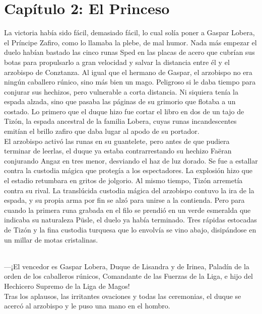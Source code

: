 \documentclass[
  letterpaper,
]{book}
\begin{document}

\hypertarget{capuxedtulo-2-el-princeso}{%
\chapter{Capítulo 2: El Princeso}\label{capuxedtulo-2-el-princeso}}

La victoria había sido fácil, demasiado fácil, lo cual solía poner a
Gaspar Lobera, el Príncipe Zafiro, como lo llamaba la plebe, de mal
humor. Nada más empezar el duelo habían bastado las cinco runas Sped en
las placas de acero que cubrían sus botas para propulsarlo a gran
velocidad y salvar la distancia entre él y el arzobispo de Conztanza. Al
igual que el hermano de Gaspar, el arzobispo no era ningún caballero
rúnico, sino más bien un mago. Peligroso si le daba tiempo para conjurar
sus hechizos, pero vulnerable a corta distancia. Ni siquiera tenía la
espada alzada, sino que pasaba las páginas de su grimorio que flotaba a
un costado. Lo primero que el duque hizo fue cortar el libro en dos de
un tajo de Tizón, la espada ancestral de la familia Lobera, cuyas runas
incandescentes emitían el brillo zafiro que daba lugar al apodo de su
portador.\\
El arzobispo activó las runas en su guantelete, pero antes de que
pudiera terminar de leerlas, el duque ya estaba contrarrestando su
hechizo Faëran conjurando Angaz en tres menor, desviando el haz de luz
dorado. Se fue a estallar contra la custodia mágica que protegía a los
espectadores. La explosión hizo que el estadio retumbara en gritos de
jolgorio. Al mismo tiempo, Tizón arremetía contra su rival. La
translúcida custodia mágica del arzobispo contuvo la ira de la espada, y
su propia arma por fin se alzó para unirse a la contienda. Pero para
cuando la primera runa grabada en el filo se prendió en un verde
esmeralda que indicaba su naturaleza Püsle, el duelo ya había terminado.
Tres rápidas estocadas de Tizón y la fina custodia turquesa que lo
envolvía se vino abajo, disipándose en un millar de motas cristalinas.\\
\strut \\
---¡El vencedor es Gaspar Lobera, Duque de Lisandra y de Irinea, Paladín
de la orden de los caballeros rúnicos, Comandante de las Fuerzas de la
Liga, e hijo del Hechicero Supremo de la Liga de Magos!\\
Tras los aplausos, las irritantes ovaciones y todas las ceremonias, el
duque se acercó al arzobispo y le puso una mano en el hombro.\\
\end{document}
